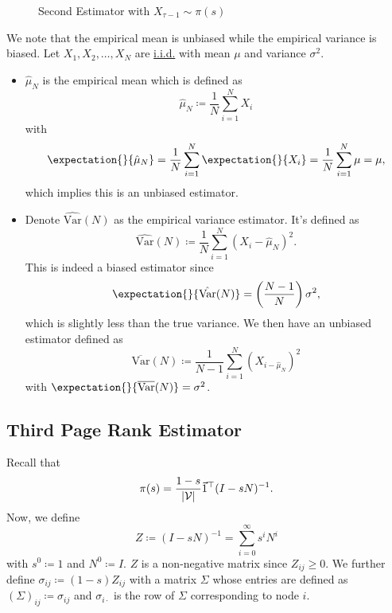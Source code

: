 \begin{figure}[H]
	\centering
	\caption{Second Estimator with \(X_{\tau-1}\sim\pi(s)\)}
	\label{fig:Monte-Carlo-Estimator-2}
\end{figure}

\begin{note}
	We note that the empirical mean is unbiased while the empirical variance is biased. Let \(X_1, X_2, \ldots  ,X_N\)
	are \hyperref[def:i.i.d.]{i.i.d.} with mean \(\mu\) and variance \(\sigma^2\).
	\begin{itemize}
		\item\(\hat{\mu}_N\) is the empirical mean which is defined as
		\[
			\hat{\mu}_N \coloneqq  \frac{1}{N}\sum\limits_{i=1}^{N} X_i
		\]
		with
		\[
			\expectation{}{\hat{\mu}_N} = \frac{1}{N}\sum\limits_{i=1}^{N} \expectation{}{X_i} = \frac{1}{N}\sum\limits_{i=1}^{N} \mu = \mu,
		\]
		which implies this is an unbiased estimator.
		\item Denote \(\hat{\mathrm{Var}}(N)\) as the empirical variance estimator. It's defined as
		      \[
			      \hat{\mathrm{Var}}(N) \coloneqq \frac{1}{N}\sum\limits_{i=1}^{N} (X_i - \hat{\mu}_N)^2.
		      \]
		      This is indeed a biased estimator since
		      \[
			      \expectation{}{\hat{\mathrm{Var}}(N)} = \left(\frac{N-1}{N}\right) \sigma^2,
		      \]
		      which is slightly less than the true variance. We then have an unbiased estimator defined as
		      \[
			      \overline{\mathrm{Var}}(N) \coloneqq  \frac{1}{N-1}\sum\limits_{i=1}^{N} (X_{i-\hat{\mu}_N})^2
		      \]
		      with \(\expectation{}{\overline{\mathrm{Var}}(N)} = \sigma^2\).
	\end{itemize}
\end{note}

\subsection{Third Page Rank Estimator}\label{subsec:third-page-rank-estimator}
Recall that
\[
	\pi(s) = \frac{1 - s}{\left\vert \mathcal{\MakeUppercase{v}}  \right\vert}\vec{1}^{\top} (I - sN)^{-1}.
\]
Now, we define
\[
	Z \coloneqq (I - sN)^{-1} = \sum\limits_{i=0}^{\infty} s^i N^i
\]
with \(s^0\coloneqq 1\) and \(N^0\coloneqq I\). \(Z\) is a non-negative matrix since \(Z_{ij}\geq 0\).
We further define \(\sigma_{ij}\coloneqq (1 - s)Z_{ij}\) with a matrix \(\Sigma \) whose entries are defined as
\(\left(\Sigma\right)_{ij}\coloneqq \sigma_{ij}\) and \(\sigma_{i\cdot}\) is the row of \(\Sigma\) corresponding
to node \(i\).


